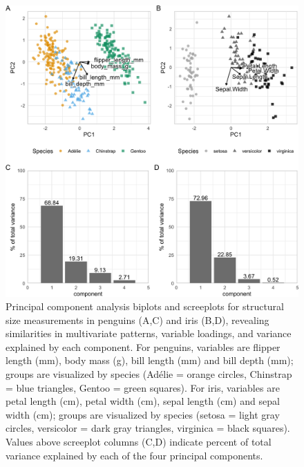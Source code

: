 \begin{Schunk}
\begin{figure}[htbp]

{\centering \includegraphics[width=1\linewidth]{figs/pca-1} 

}

\caption[Principal component analysis biplots and screeplots for structural size measurements in penguins (A,C) and iris (B,D), revealing similarities in multivariate patterns, variable loadings, and variance explained by each component]{Principal component analysis biplots and screeplots for structural size measurements in penguins (A,C) and iris (B,D), revealing similarities in multivariate patterns, variable loadings, and variance explained by each component. For penguins, variables are flipper length (mm), body mass (g), bill length (mm) and bill depth (mm); groups are visualized by species (Adélie = orange circles, Chinstrap = blue triangles, Gentoo = green squares). For iris, variables are petal length (cm), petal width (cm), sepal length (cm) and sepal width (cm); groups are visualized by species (setosa = light gray circles, versicolor = dark gray triangles, virginica = black squares). Values above screeplot columns (C,D) indicate percent of total variance explained by each of the four principal components.}\label{fig:pca}
\end{figure}
\end{Schunk}

